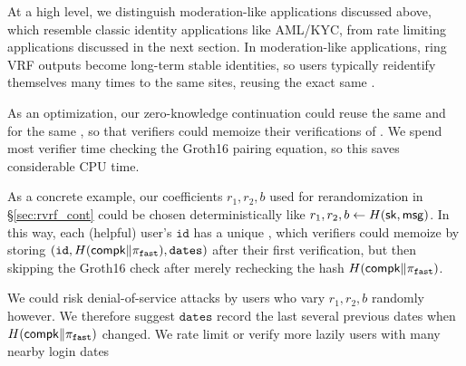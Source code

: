 At a high level, we distinguish moderation-like applications discussed
above, which resemble classic identity applications like AML/KYC, from
rate limiting applications discussed in the next section. 
%
In moderation-like applications, ring VRF outputs become long-term
stable identities, so users typically reidentify themselves many times
to the same sites, reusing the exact same \msg.

As an optimization, our zero-knowledge continuation could reuse the
same \compk and \pifast for the same \msg, so that verifiers could
memoize their verifications of \pifast.  We spend most verifier time
checking the Groth16 pairing equation, so this saves considerable CPU time. %

As a concrete example, our coefficients $r_1,r_2,b$ used for
rerandomization in \S\ref{sec:rvrf_cont} could be chosen
deterministically like $r_1,r_2,b \leftarrow H(\mathsf{sk},\mathsf{msg})$.
In this way, each (helpful) user's $\mathtt{id}$ has a unique \pifast,
which verifiers could memoize by storing
 $(\mathtt{id},H(\mathsf{compk} \| \pi_{\mathtt{fast}}),\mathtt{dates})$
after their first verification, but then skipping the Groth16 check
 after merely rechecking the hash $H(\mathsf{compk} \| \pi_{\mathtt{fast}})$.

We could risk denial-of-service attacks by users who vary $r_1,r_2,b$ 
randomly however.  We therefore suggest $\mathtt{dates}$ record the last
several previous dates when $H(\mathsf{compk} \| \pi_{\mathtt{fast}})$ changed.
We rate limit or verify more lazily users with many nearby login dates

